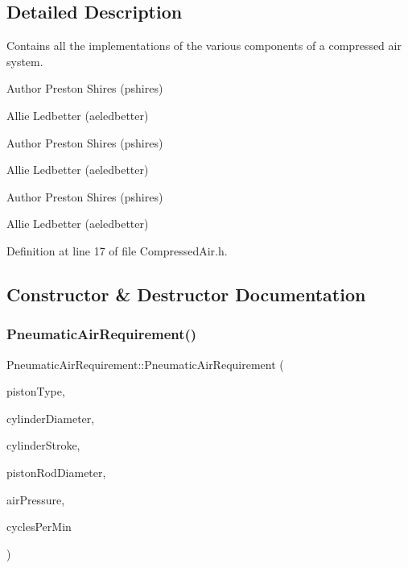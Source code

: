 \subsection{Detailed Description}
Contains all the implementations of the various components of a compressed air system. 

\begin{DoxyAuthor}{Author}
Preston Shires (pshires) 

Allie Ledbetter (aeledbetter) 
\end{DoxyAuthor}


\begin{DoxyAuthor}{Author}
Preston Shires (pshires) 

Allie Ledbetter (aeledbetter) 
\end{DoxyAuthor}


\begin{DoxyAuthor}{Author}
Preston Shires (pshires) 

Allie Ledbetter (aeledbetter) 
\end{DoxyAuthor}


Definition at line 17 of file Compressed\+Air.\+h.



\subsection{Constructor \& Destructor Documentation}
\mbox{\label{class_pneumatic_air_requirement_a1255612b8467e69471c097c94eabcf69}} 
\subsubsection{\texorpdfstring{Pneumatic\+Air\+Requirement()}{PneumaticAirRequirement()}\hspace{0.1cm}{\footnotesize\ttfamily [1/6]}}
{\footnotesize\ttfamily Pneumatic\+Air\+Requirement\+::\+Pneumatic\+Air\+Requirement (\begin{DoxyParamCaption}\item[{Piston\+Type}]{piston\+Type,  }\item[{double}]{cylinder\+Diameter,  }\item[{double}]{cylinder\+Stroke,  }\item[{double}]{piston\+Rod\+Diameter,  }\item[{double}]{air\+Pressure,  }\item[{double}]{cycles\+Per\+Min }\end{DoxyParamCaption})}

